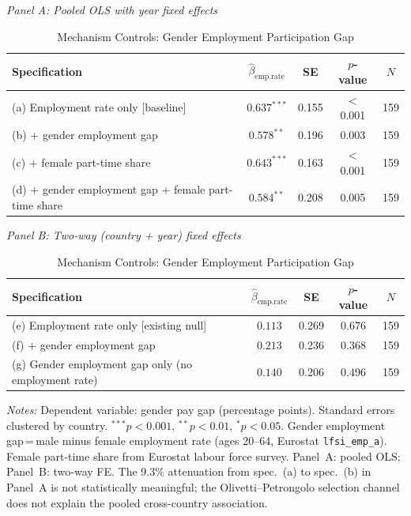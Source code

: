 \documentclass[12pt,a4paper]{article}
\begin{document}
\begin{table}[htbp]
\caption{Mechanism Controls: Gender Employment Participation Gap}
\label{tab:mechanism}
\begin{threeparttable}
\smallskip
\textit{Panel A: Pooled OLS with year fixed effects}
\smallskip
\begin{tabular}{lcccc}
\toprule
Specification & $\hat{\beta}_{\text{emp.rate}}$ & SE & $p$-value & $N$ \\
\midrule
(a) Employment rate only [baseline]
  & $0.637^{***}$ & 0.155 & $<$0.001 & 159 \\
(b) + gender employment gap
  & $0.578^{**}$  & 0.196 & 0.003    & 159 \\
(c) + female part-time share
  & $0.643^{***}$ & 0.163 & $<$0.001 & 159 \\
(d) + gender employment gap + female part-time share
  & $0.584^{**}$  & 0.208 & 0.005    & 159 \\
\bottomrule
\end{tabular}

\bigskip
\textit{Panel B: Two-way (country + year) fixed effects}
\smallskip
\begin{tabular}{lcccc}
\toprule
Specification & $\hat{\beta}_{\text{emp.rate}}$ & SE & $p$-value & $N$ \\
\midrule
(e) Employment rate only [existing null]
  & $0.113$  & 0.269 & 0.676 & 159 \\
(f) + gender employment gap
  & $0.213$  & 0.236 & 0.368 & 159 \\
(g) Gender employment gap only (no employment rate)
  & $0.140$  & 0.206 & 0.496 & 159 \\
\bottomrule
\end{tabular}
\begin{tablenotes}
\footnotesize
\item \textit{Notes:} Dependent variable: gender pay gap (percentage points).
  Standard errors clustered by country.
  $^{***}p<0.001$, $^{**}p<0.01$, $^{*}p<0.05$.
  Gender employment gap\,=\,male minus female employment rate (ages 20--64,
  Eurostat \texttt{lfsi\_emp\_a}).  Female part-time share from Eurostat
  labour force survey.  Panel~A: pooled OLS; Panel~B: two-way FE.
  The 9.3\% attenuation from spec.~(a) to spec.~(b) in Panel~A is not
  statistically meaningful; the Olivetti--Petrongolo selection channel does
  not explain the pooled cross-country association.
\end{tablenotes}
\end{threeparttable}
\end{table}
\end{document}

